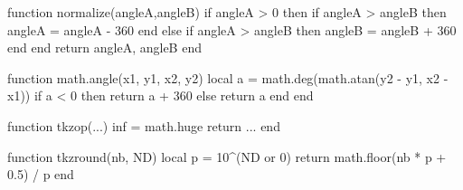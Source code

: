 
\makeatletter

\begin{luacode*}
  function normalize(angleA,angleB)
      if angleA > 0 then
       if angleA > angleB then
          angleA = angleA - 360
          end
      else
     if angleA > angleB then
          angleB = angleB + 360
        end
      end
      return angleA, angleB
  end

  function math.angle(x1, y1, x2, y2)
      local a = math.deg(math.atan(y2 - y1, x2 - x1))
      if a < 0 then
          return a + 360
      else
          return a
      end
  end

  function tkzop(...)
  inf = math.huge
  return ...
end

function tkzround(nb, ND)
  local p = 10^(ND or 0)
   return math.floor(nb * p + 0.5) / p
end
\end{luacode*}

\def\tkz@Dec#1{%
     \directlua{tex.print(string.format('\@percentchar.6f',#1))}
     }
\def\tkz@Op#1{\directlua{tex.sprint(tostring(tkzop(#1)))}}
\def\tkz@Log#1{\directlua{tex.sprint(math.log(#1))}}
\def\tkz@Exp#1{\directlua{tex.sprint(math.exp(#1))}}
\def\tkz@Sqrt#1{\directlua{tex.sprint(math.sqrt(#1))}}
\def\tkz@Abs#1{\directlua{tex.sprint(math.abs(#1))}}
\def\tkz@Pi{\directlua{tex.sprint(math.pi)}}
\def\tkz@Cos#1{\directlua{tex.sprint(math.cos(#1))}}
\def\tkz@Sin#1{\directlua{tex.sprint(tostring(math.sin(#1)))}}
\def\tkz@Tan#1{\directlua{tex.sprint(math.tan(#1))}}
\def\tkz@Rad#1{\directlua{tex.sprint(math.rad(#1))}}
\def\tkz@Acos#1{\directlua{tex.sprint(math.acos(#1))}}
\def\tkz@Asin#1{\directlua{tex.sprint(math.asin(#1))}}
\def\tkz@Atan#1{\directlua{tex.sprint(math.atan(#1))}}
\def\tkz@Round#1#2{\directlua{tex.sprint(tostring(tkzround(#1,#2)))}}
\def\tkz@Angle#1#2#3#4{\directlua{tex.sprint(math.angle(#1,#2,#3,#4))}}
\def\tkz@Ceil#1{\directlua{tex.sprint(math.ceil(#1))}}
\def\tkz@Floor#1{\directlua{tex.sprint(math.floor(#1))}}
\def\tkz@Huge{\directlua{tex.sprint(math.huge)}}
\def\tkz@Max#1{\directlua{tex.sprint(math.max(#1))}}
\def\tkz@Min#1{\directlua{tex.sprint(math.min(#1))}}
\def\tkz@Random#1{\directlua{tex.sprint(math.random(#1))}}
\def\tkz@veclen#1#2{%
  \directlua{%
    tex.print(string.format('\@percentchar.6f',math.sqrt((#1)^2+(#2)^2)))%
  }%
}
\let\tkzSqrt\tkz@Sqrt
\let\tkzPi\tkz@Pi
\let\tkzExp\tkz@Exp
\let\tkzLog\tkz@Log
\let\tkzSin\tkz@Sin
\let\tkzCos\tkz@Cos

